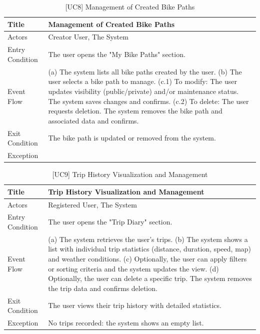 \begin{table}[H]
    \centering
    \begin{tabular}{|p{4cm}|p{10cm}|}
        \hline
        Title & \textbf{Management of Created Bike Paths} \\
        \hline
        Actors & Creator User, The System \\
        \hline
        Entry Condition & The user opens the "My Bike Paths" section. \\
        \hline
        Event Flow & 
        (a) The system lists all bike paths created by the user. \newline
        (b) The user selects a bike path to manage. \newline
        (c.1) To modify: The user updates visibility (public/private) and/or maintenance status. The system saves changes and confirms. \newline
        (c.2) To delete: The user requests deletion. The system removes the bike path and associated data and confirms. \\
        \hline
        Exit Condition & The bike path is updated or removed from the system. \\
        \hline
        Exception & \\
        \hline
    \end{tabular}
    \caption{[UC8] Management of Created Bike Paths}
    \label{tab:uc8}
\end{table}

\begin{table}[H]
    \centering
    \begin{tabular}{|p{4cm}|p{10cm}|}
        \hline
        Title & \textbf{Trip History Visualization and Management} \\
        \hline
        Actors & Registered User, The System \\
        \hline
        Entry Condition & The user opens the "Trip Diary" section. \\
        \hline
        Event Flow & 
        (a) The system retrieves the user's trips. \newline
        (b) The system shows a list with individual trip statistics (distance, duration, speed, map) and weather conditions. \newline
        (c) Optionally, the user can apply filters or sorting criteria and the system updates the view. \newline
        (d) Optionally, the user can delete a specific trip. The system removes the trip data and confirms deletion. \\
        \hline
        Exit Condition & The user views their trip history with detailed statistics. \\
        \hline
        Exception & 
        No trips recorded: the system shows an empty list. \\
        \hline
    \end{tabular}
    \caption{[UC9] Trip History Visualization and Management}
    \label{tab:uc9}
\end{table}


